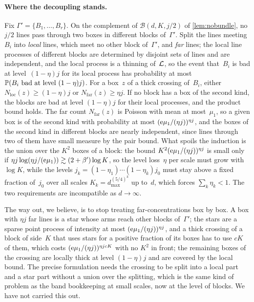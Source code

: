 \documentclass[11pt,letterpaper]{article}
\begin{document}
\paragraph{Where the decoupling stands.} Fix $\Gamma'=\{B_1,\dots,B_r\}$. On the complement of $\mathcal B(d,K,j/2)$ of \cref{lem:nobundle}, no $j/2$ lines pass through two boxes in different blocks of~$\Gamma'$. Split the lines meeting~$B_i$ into \emph{local} lines, which meet no other block of~$\Gamma'$, and \emph{far} lines; the local line processes of different blocks are determined by disjoint sets of lines and are independent, and the local process is a thinning of~$\cL$, so the event that~$B_i$ is bad at level~$(1-\eta)j$ for its local process has probability at most $\P(B_i\text{ bad at level }(1-\eta)j)$. For a box~$z$ of a thick crossing of~$B_i$, either $N_{\mathrm{loc}}(z)\ge(1-\eta)j$ or $N_{\mathrm{far}}(z)\ge\eta j$. If no block has a box of the second kind, the blocks are bad at level $(1-\eta)j$ for their local processes, and the product bound holds. The far count $N_{\mathrm{far}}(z)$ is Poisson with mean at most~$\mu_1$, so a given box is of the second kind with probability at most $(\e\mu_1/(\eta j))^{\eta j}$, and the boxes of the second kind in different blocks are nearly independent, since lines through two of them have small measure by the pair bound. What spoils the induction is the union over the $K^2$ boxes of a block: the bound $K^2(\e\mu_1/(\eta j))^{\eta j}$ is small only if $\eta j\log(\eta j/(\e\mu_1))\gtrsim(2+\beta')\log K$, so the level loss~$\eta$ per scale must grow with $\log K$, while the levels $j_k=(1-\eta_1)\cdots(1-\eta_k)j_0$ must stay above a fixed fraction of~$j_0$ over all scales $K_k=d_{\max}^{(5/4)^k}$ up to~$d$, which forces $\sum_k\eta_k<1$. The two requirements are incompatible as $d\to\infty$.

The way out, we believe, is to stop treating far-concentrations box by box. A box with $\eta j$ far lines is a star whose arms reach other blocks of~$\Gamma'$; the stars are a sparse point process of intensity at most $(\e\mu_1/(\eta j))^{\eta j}$, and a thick crossing of a block of side~$K$ that uses stars for a positive fraction of its boxes has to use $cK$ of them, which costs $(\e\mu_1/(\eta j))^{\eta jcK}$ with no $K^2$ in front; the remaining boxes of the crossing are locally thick at level $(1-\eta)j$ and are covered by the local bound. The precise formulation needs the crossing to be split into a local part and a star part without a union over the splitting, which is the same kind of problem as the band bookkeeping at small scales, now at the level of blocks. We have not carried this out.
\end{document}
